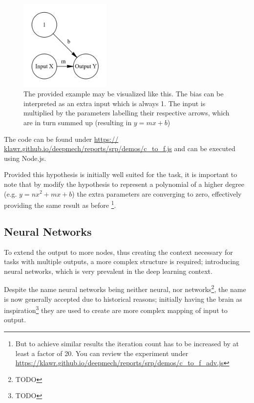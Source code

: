 \begin{figure}
    \centering
    \caption{ The provided example may be visualized like this. The bias can be interpreted as
    an extra input which is always 1. The input is multiplied by the parameters
    labelling their respective arrows, which are in turn summed up
    (resulting in $y = mx + b$) }
    \includegraphics[width=0.4\textwidth]{images/1_simplest_nn.png}
\end{figure}

The code can be found under
\url{https:// klawr.github.io/deepmech/reports/srp/demos/c_to_f.js}
and can be executed using Node.js.


Provided this hypothesis is initially well suited for the task, it is important to note
that by modify the hypothesis to represent a polynomial of a higher degree
(e.g. $y = nx^2 + mx + b$) the extra parameters are converging to zero,
effectively providing the same result as before
\footnote{But to achieve similar results the iteration count has to be increased by at least a
factor of 20. You can review the experiment under
\url{https://klawr.github.io/deepmech/reports/srp/demos/c_to_f_adv.js}}.

\subsection{Neural Networks} \label{ch:neural_networks}

To extend the output to more nodes,
thus creating the context necessary for tasks with multiple outputs, a more complex structure
is required; introducing neural networks, which is very
prevalent in the deep learning context.

Despite the name neural networks being neither neural, nor networks\footnote{ TODO },
the name is now generally accepted due to historical reasons; initially having the
brain as inspiration\footnote{ TODO } they are used to create are more complex mapping 
of input to output.

